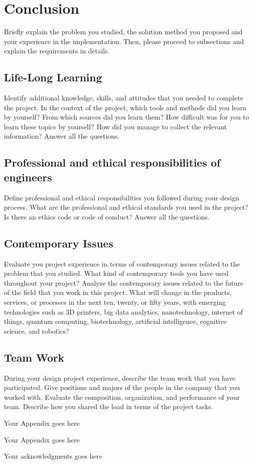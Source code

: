 \documentclass{mefsdp}
\begin{document}
	\section{Conclusion}
	Briefly explain the problem you studied, the solution method you proposed and your experience in the implementation. Then, please proceed to subsections and explain the requirements in details. 
	
	\subsection{Life-Long Learning}
	Identify additional knowledge, skills, and attitudes that you needed to complete the project. In the context of the project, which tools and methods did you learn by yourself?  From which sources did you learn them? How difficult was for you to learn these topics by yourself? How did you manage to collect the relevant information? Answer all the questions.
	
	\subsection{Professional and ethical responsibilities of engineers}
	Define professional and ethical responsibilities you followed during your design process. What are the professional and ethical standards you used in the project? Is there an ethics code or code of conduct? Answer all the questions.
	
	\subsection{Contemporary Issues}
	Evaluate you project experience in terms of contemporary issues related to the problem that you studied. What kind of contemporary tools you have used throughout your project? Analyze the contemporary issues related to the future of the field that you work in this project. What will change in the products, services, or processes in the next ten, twenty, or fifty years, with emerging technologies such as 3D printers, big data analytics, nanotechnology, internet of things, quantum computing, biotechnology, artificial intelligence, cognitive science, and robotics?
	
	\subsection{Team Work}
	During your design project experience, describe the team work that you have participated. Give positions and majors of the people in the company that you worked with. Evaluate the composition, organization, and performance of your team. Describe how you shared the load in terms of the project tasks. 
	
	\begin{appendix}[A]
		Your Appendix goes here
	\end{appendix}

	\begin{appendix}[B]
		Your Appendix goes here
	\end{appendix}
	
	\begin{acknowledgments}
		Your acknowledgments goes here
	\end{acknowledgments}
	
	
	
\end{document}
